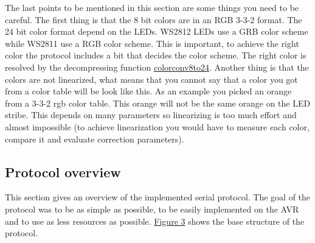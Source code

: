  The last points to be mentioned in this section are some things you need to be careful. The first thing is that the 8 bit colors are in an R\+G\+B 3-\/3-\/2 format. The 24 bit color format depend on the L\+E\+Ds. W\+S2812 L\+E\+Ds use a G\+R\+B color scheme while W\+S2811 use a R\+G\+B color scheme. This is important, to achieve the right color the protocol includes a bit that decides the color scheme. The right color is resolved by the decompressing function \hyperlink{_led_effects_8h_a55291315ab0f2ca8d508f0e9da1920a7}{colorconv8to24}. Another thing is that the colors are not linearized, what means that you cannot say that a color you got from a color table will be look like this. As an example you picked an orange from a 3-\/3-\/2 rgb color table. This orange will not be the same orange on the L\+E\+D stribe. This depends on many parameters so linearizing is too much effort and almost impossible (to achieve linearization you would have to measure each color, compare it and evaluate correction parameters).\hypertarget{index_protocol_sec}{}\subsection{Protocol overview}\label{index_protocol_sec}
This section gives an overview of the implemented serial protocol. The goal of the protocol was to be as simple as possible, to be easily implemented on the A\+V\+R and to use as less resources as possible. \hyperlink{index_three}{Figure 3} shows the base structure of the protocol. \label{index_three}%
\hypertarget{index_three}{}%
  
